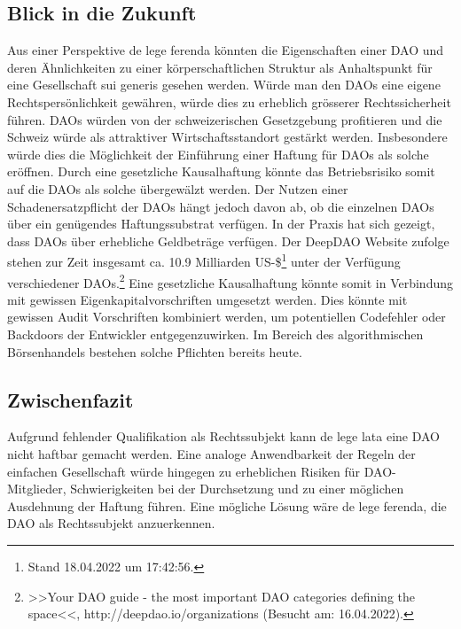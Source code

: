 \documentclass[a4paper,12pt]{report}
\begin{document}
	\subsection{Blick in die Zukunft}
	\startsubsection
	Aus einer Perspektive de lege ferenda könnten die Eigenschaften einer DAO und deren Ähnlichkeiten zu einer körperschaftlichen Struktur als Anhaltspunkt für eine Gesellschaft sui generis gesehen werden. Würde man den DAOs eine eigene Rechtspersönlichkeit gewähren, würde dies zu erheblich grösserer Rechtssicherheit führen. DAOs würden von der schweizerischen Gesetzgebung profitieren und die Schweiz würde als attraktiver Wirtschaftsstandort gestärkt werden. Insbesondere würde dies die Möglichkeit der Einführung einer Haftung für DAOs als solche eröffnen. Durch eine gesetzliche Kausalhaftung könnte das Betriebsrisiko somit auf die DAOs als solche übergewälzt werden. Der Nutzen einer Schadenersatzpflicht der DAOs hängt jedoch davon ab, ob die einzelnen DAOs über ein genügendes Haftungssubstrat verfügen. In der Praxis hat sich gezeigt, dass DAOs über erhebliche Geldbeträge verfügen. Der DeepDAO Website zufolge stehen zur Zeit insgesamt ca. 10.9 Milliarden US-\$\footnote{\hspace{0.5em}Stand 18.04.2022 um 17:42:56.} unter der Verfügung verschiedener DAOs.\footnote{\hspace{0.5em}\begin{minipage}[t]{13cm}>>Your DAO guide - the most important DAO categories defining the space<<, http://deepdao.io/organizations (Besucht am: 16.04.2022).\end{minipage}} Eine gesetzliche Kausalhaftung könnte somit in Verbindung mit gewissen Eigenkapitalvorschriften umgesetzt werden. Dies könnte mit gewissen Audit Vorschriften kombiniert werden, um potentiellen Codefehler oder Backdoors der Entwickler entgegenzuwirken. Im Bereich des algorithmischen Börsenhandels bestehen solche Pflichten bereits heute.
	\closesection
	\subsection{Zwischenfazit}
	\startsubsection
	Aufgrund fehlender Qualifikation als Rechtssubjekt kann de lege lata eine DAO nicht haftbar gemacht werden. Eine analoge Anwendbarkeit der Regeln der einfachen Gesellschaft würde hingegen zu erheblichen Risiken für DAO-Mitglieder, Schwierigkeiten bei der Durchsetzung und zu einer möglichen Ausdehnung der Haftung führen. Eine mögliche Lösung wäre de lege ferenda, die DAO als Rechtssubjekt anzuerkennen.
	\closesection
	\closesection
\end{document}
